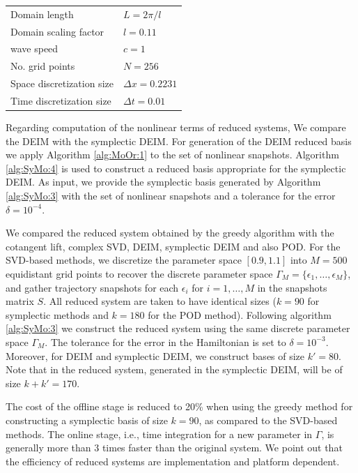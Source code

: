 \vspace{0.5cm}
\begin{center}
\begin{tabular}{|l|l|}
\hline
Domain length & $L = 2\pi /l$ \\
Domain scaling factor & $l = 0.11$ \\
wave speed & $c =1$\\
No. grid points & $N = 256$ \\
Space discretization size & $\Delta x = 0.2231$ \\
Time discretization size & $\Delta t = 0.01$ \\
\hline
\end{tabular}
\end{center}
\vspace{0.5cm}

Regarding computation of the nonlinear terms of reduced systems, We compare the DEIM with the symplectic DEIM. For generation of the DEIM reduced basis we apply Algorithm \ref{alg:MoOr:1} to the set of nonlinear snapshots. Algorithm \ref{alg:SyMo:4} is used to construct a reduced basis appropriate for the symplectic DEIM. As input, we provide the symplectic basis generated by Algorithm \ref{alg:SyMo:3} with the set of nonlinear snapshots and a tolerance for the error $\delta = 10^{-4}$.

We compared the reduced system obtained by the greedy algorithm with the cotangent lift, complex SVD, DEIM, symplectic DEIM and also POD. For the SVD-based methods, we discretize the parameter space $[0.9,1.1]$ into $M=500$ equidistant grid points to recover the discrete parameter space $\Gamma_M = \{\epsilon_1,\dots,\epsilon_M \}$, and gather trajectory snapshots for each $\epsilon_i$ for $i = 1,\dots,M$ in the snapshots matrix $S$. All reduced system are taken to have identical sizes ($k=90$ for symplectic methods and $k=180$ for the POD method). Following algorithm \ref{alg:SyMo:3} we construct the reduced system using the same discrete parameter space $\Gamma_M$. The tolerance for the error in the Hamiltonian is set to $\delta = 10^{-3}$. Moreover, for DEIM and symplectic DEIM, we construct bases of size $k'=80$. Note that in the reduced system, generated in the symplectic DEIM, will be of size $k+k'=170$.

The cost of the offline stage is reduced to 20\% when using the greedy method for constructing a symplectic basis of size $k=90$, as compared to the SVD-based methods. The online stage, i.e., time integration for a new parameter in $\Gamma$, is generally more than 3 times faster than the original system. We point out that the efficiency of reduced systems are implementation and platform dependent.

